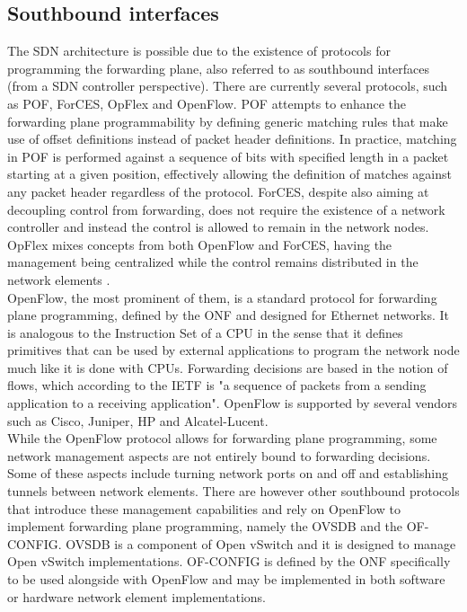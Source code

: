 \subsection{Southbound interfaces}
\label{subsection:sdn-southbound-interfaces}
The \gls{SDN} architecture is possible due to the existence of protocols for programming the forwarding plane, also referred to as southbound interfaces (from a \gls{SDN} controller perspective).
There are currently several protocols, such as \gls{POF}\cite{POF}, \gls{ForCES}\cite{ForCES}, OpFlex\cite{OpFlex} and OpenFlow\cite{OFWP}.
%
\gls{POF} attempts to enhance the forwarding plane programmability by defining generic matching rules that make use of offset definitions instead of packet header definitions.
In practice, matching in \gls{POF} is performed against a sequence of bits with specified length in a packet starting at a given position, effectively allowing the definition of matches against any packet header regardless of the protocol\cite{POF}.
%
\gls{ForCES}, despite also aiming at decoupling control from forwarding, does not require the existence of a network controller and instead the control is allowed to remain in the network nodes\cite{Kreutz2014}.
%
OpFlex mixes concepts from both OpenFlow and \gls{ForCES}, having the management being centralized while the control remains distributed in the network elements \cite{Duffy2014}.\\
%

OpenFlow, the most prominent of them, is a standard protocol for forwarding plane programming, defined by the \gls{ONF} and designed for Ethernet networks\cite{OFWP}.
It is analogous to the Instruction Set of a \gls{CPU} in the sense that it defines primitives that can be used by external applications to program the network node much like it is done with \glspl{CPU}\cite{OFWP}.
Forwarding decisions are based in the notion of flows, which according to the \gls{IETF} is "a sequence of packets from a sending application to a receiving application"\cite{IETFFLOW}.
OpenFlow is supported by several vendors such as Cisco\cite{CISCOOF}, Juniper\cite{JUNOSOF}, HP\cite{HPVAN} and Alcatel-Lucent\cite{ALUOF}.\\
%
While the OpenFlow protocol allows for forwarding plane programming, some network management aspects are not entirely bound to forwarding decisions.
Some of these aspects include turning network ports on and off and establishing tunnels between network elements.
There are however other southbound protocols that introduce these management capabilities and rely on OpenFlow to implement forwarding plane programming, namely the \gls{OVSDB} and the \gls{OF-CONFIG}\cite{OVSDBvsOFCONFIG}.
\gls{OVSDB} is a component of Open vSwitch and it is designed to manage Open vSwitch implementations.
\gls{OF-CONFIG} is defined by the \gls{ONF} specifically to be used alongside with OpenFlow and may be implemented in both software or hardware network element implementations.
%
%
